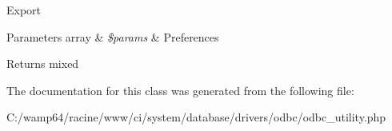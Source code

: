 Export


\begin{DoxyParams}[1]{Parameters}
array & {\em \$params} & Preferences \\
\hline
\end{DoxyParams}
\begin{DoxyReturn}{Returns}
mixed 
\end{DoxyReturn}


The documentation for this class was generated from the following file\+:\begin{DoxyCompactItemize}
\item 
C\+:/wamp64/racine/www/ci/system/database/drivers/odbc/odbc\+\_\+utility.\+php\end{DoxyCompactItemize}
